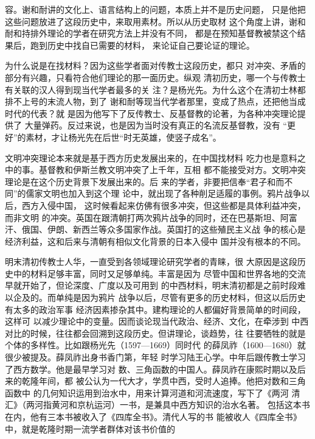 容。谢和耐讲的文化上、语言结构上的问题，本质上并不是历史问题，%
只是他把这些问题放进了这段历史中，来取用素材。所以从历史取材%
这个角度上讲，谢和耐和持排外理论的学者在研究方法上并没有不同，%
都是在预知基督教被禁这个结果后，跑到历史中找自已需要的材料，%
来论证自己要论证的理论。%
\par
为什么说是在找材料？因为这些学者面对传教士这段历史，都只%
对冲突、矛盾的部分有兴趣，只看符合他们理论的那一面历史。纵观%
清初历史，哪一个与传教士有关联的汉人得到现当代学者最多的关%
注？是杨光先。为什么这个在清初士林都排不上号的末流人物，到了%
谢和耐等现当代学者那里，变成了热点，还把他当成时代的代表？就%
是因为他写下了反传教士、反基督教的论著，为各种冲突理论提供了%
大量弹药。反过来说，也是因为当时没有真正的名流反基督教，没有%
“更好”的素材，才让杨光先在后世“时无英雄，使竖子成名”。%
\par
文明冲突理论本来就是基于西方历史发展出来的，在中国找材料%
吃力也是意料之中的事。基督教和伊斯兰教文明冲突了上千年，互相%
都不能接受对方。文明冲突理论是在这个历史背景下发展出来的。后%
来的学者，非要把信奉“君子和而不同”的儒家文明也加入到这个理%
论中，就出现了各种削足适履的事例。鸦片战争以后，西方入侵中国，%
这时候看起来仿佛有很多冲突，但这些都是具体利益冲突，而非文明%
的冲突。英国在跟清朝打两次鸦片战争的同时，还在巴基斯坦、阿富%
汗、俄国、伊朗、新西兰等众多国家作战。英国打的这些殖民主义战%
争的核心是经济利益，这和后来与清朝有相似文化背景的日本入侵中%
国并没有根本的不同。%
\par
明末清初传教士人华，一直受到各领域理论研究学者的青睐，很%
大原因是这段历史中的材料足够丰富，同时又足够单纯。丰富是因为%
尽管中国和世界各地的交流早就开始了，但论深度、广度以及可用到%
的中西材料，明末清初都是之前时段难以企及的。而单纯是因为鸦片%
战争以后，尽管有更多的历史材料，但这以后历史有太多的政治军事%
经济因素掺杂其中。建构理论的人都偏好背景简单的时间段，这样可%
以减少理论中的变量。因而谈论现当代政治、经济、文化，在牵涉到%
中西对比的时候，往往都会回溯到这段历史。但讲理论，谈趋势，往%
往要牺牲的就是个体的多样性。比如跟杨光先（1597—1669）同时代%
的薛凤祚（1600—1680）就很少被提及。薛凤祚出身书香门第，年轻%
时学习陆王心学。中年后跟传教士学习了西方数学。他是最早学习对%
数、三角函数的中国人。薛凤祚在康熙时期以及后来的乾隆年间，都%
被公认为一代大才，学贯中西，受时人追捧。他把对数和三角函数中%
的几何知识运用到治水中，用来计算河道和河流速度，写下了《两河%
清汇》（两河指黄河和京杭运河）一书，是兼具中西方知识的治水名著。%
包括这本书在内，他有三本书被收入了《四库全书》。清代人写的书%
能被收人《四库全书》中，就是乾隆时期一流学者群体对该书价值的%
